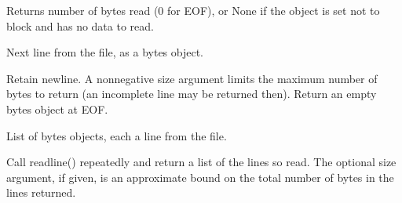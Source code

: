 \documentclass[letterpaper,10pt,english]{sphinxmanual}
\begin{document}
\begin{fulllineitems}
\begin{fulllineitems}
\sphinxAtStartPar
Returns number of bytes read (0 for EOF), or None if the object
is set not to block and has no data to read.

\end{fulllineitems}


\begin{fulllineitems}
\label{\detokenize{modules/src.pig_sorting_api.main:src.pig_sorting_api.main.BytesIO.readline}}
\pysigstartsignatures
\pysiglinewithargsret
{}
{\sphinxparamcomma {}}
{}
\pysigstopsignatures
\sphinxAtStartPar
Next line from the file, as a bytes object.

\sphinxAtStartPar
Retain newline.  A non\sphinxhyphen{}negative size argument limits the maximum
number of bytes to return (an incomplete line may be returned then).
Return an empty bytes object at EOF.

\end{fulllineitems}


\begin{fulllineitems}
\label{\detokenize{modules/src.pig_sorting_api.main:src.pig_sorting_api.main.BytesIO.readlines}}
\pysigstartsignatures
\pysiglinewithargsret
{}
{\sphinxparamcomma {}}
{}
\pysigstopsignatures
\sphinxAtStartPar
List of bytes objects, each a line from the file.

\sphinxAtStartPar
Call readline() repeatedly and return a list of the lines so read.
The optional size argument, if given, is an approximate bound on the
total number of bytes in the lines returned.

\end{fulllineitems}



\end{fulllineitems}
\end{document}
